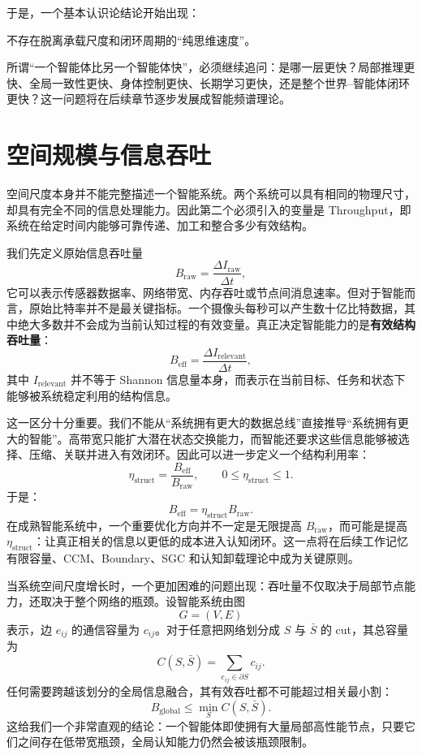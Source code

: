 于是，一个基本认识论结论开始出现：

\begin{conclusion}
不存在脱离承载尺度和闭环周期的“纯思维速度”。
\end{conclusion}

所谓“一个智能体比另一个智能体快”，必须继续追问：是哪一层更快？局部推理更快、全局一致性更快、身体控制更快、长期学习更快，还是整个世界--智能体闭环更快？这一问题将在后续章节逐步发展成智能频谱理论。

\section{空间规模与信息吞吐}

空间尺度本身并不能完整描述一个智能系统。两个系统可以具有相同的物理尺寸，却具有完全不同的信息处理能力。因此第二个必须引入的变量是 Throughput，即系统在给定时间内能够可靠传递、加工和整合多少有效结构。

我们先定义原始信息吞吐量
\[
B_{\mathrm{raw}}
=
\frac{\Delta I_{\mathrm{raw}}}{\Delta t},
\]
它可以表示传感器数据率、网络带宽、内存吞吐或节点间消息速率。但对于智能而言，原始比特率并不是最关键指标。一个摄像头每秒可以产生数十亿比特数据，其中绝大多数并不会成为当前认知过程的有效变量。真正决定智能能力的是\textbf{有效结构吞吐量}：
\[
B_{\mathrm{eff}}
=
\frac{\Delta I_{\mathrm{relevant}}}{\Delta t},
\]
其中 $I_{\mathrm{relevant}}$ 并不等于 Shannon 信息量本身，而表示在当前目标、任务和状态下能够被系统稳定利用的结构信息。

这一区分十分重要。我们不能从“系统拥有更大的数据总线”直接推导“系统拥有更大的智能”。高带宽只能扩大潜在状态交换能力，而智能还要求这些信息能够被选择、压缩、关联并进入有效闭环。因此可以进一步定义一个结构利用率：
\[
\eta_{\mathrm{struct}}
=
\frac{B_{\mathrm{eff}}}{B_{\mathrm{raw}}},
\qquad
0\leq\eta_{\mathrm{struct}}\leq1.
\]
于是：
\[
B_{\mathrm{eff}}
=
\eta_{\mathrm{struct}}B_{\mathrm{raw}}.
\]
在成熟智能系统中，一个重要优化方向并不一定是无限提高 $B_{\mathrm{raw}}$，而可能是提高 $\eta_{\mathrm{struct}}$：让真正相关的信息以更低的成本进入认知闭环。这一点将在后续工作记忆有限容量、CCM、Boundary、SGC 和认知卸载理论中成为关键原则。

当系统空间尺度增长时，一个更加困难的问题出现：吞吐量不仅取决于局部节点能力，还取决于整个网络的瓶颈。设智能系统由图
\[
G=(V,E)
\]
表示，边 $e_{ij}$ 的通信容量为 $c_{ij}$。对于任意把网络划分成 $S$ 与 $\bar S$ 的 cut，其总容量为
\[
C(S,\bar S)
=
\sum_{e_{ij}\in \partial S}
c_{ij}.
\]
任何需要跨越该划分的全局信息融合，其有效吞吐都不可能超过相关最小割：
\[
\boxed{
B_{\mathrm{global}}
\leq
\min_{S}C(S,\bar S).
}
\]
这给我们一个非常直观的结论：一个智能体即使拥有大量局部高性能节点，只要它们之间存在低带宽瓶颈，全局认知能力仍然会被该瓶颈限制。

